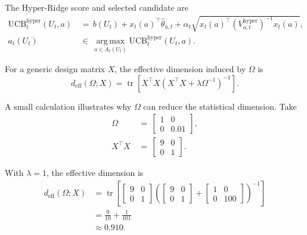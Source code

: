 \documentclass{article} %
\begin{document}
The Hyper-Ridge score and selected candidate are
\begin{align}
\mathrm{UCB}_{t}^{\mathrm{hyper}}(U_t,a)
&\,=\,
b(U_t)+x_t(a)^\top \widehat{\theta}_{a,t}
+
\alpha_t
\sqrt{
x_t(a)^\top
\left(V_{a,t}^{\mathrm{hyper}}\right)^{-1}
x_t(a)
},
\label{eq:hyper-ucb-app}
\\
a_t(U_t)
&\,\in\,
\operatorname*{arg\,max}_{a\in A_t(U_t)}
\mathrm{UCB}_{t}^{\mathrm{hyper}}(U_t,a).
\label{eq:hyper-action}
\end{align}

For a generic design matrix \(X\), the effective dimension induced by \(\Omega\) is
\begin{equation}
\label{eq:hyper-deff-app}
d_{\mathrm{eff}}(\Omega;X)
=
\operatorname{tr}
\!\left[
X^\top X
\left(
X^\top X+\lambda\Omega^{-1}
\right)^{-1}
\right].
\end{equation}

A small calculation illustrates why \(\Omega\) can reduce the statistical
dimension. Take
\begin{align}
\Omega
&\,=\,
\begin{bmatrix}
1&0\\
0&0.01
\end{bmatrix},
\label{eq:hyper-example-omega}
\\
X^\top X
&\,=\,
\begin{bmatrix}
9&0\\
0&1
\end{bmatrix}.
\label{eq:hyper-example-xtx}
\end{align}

With \(\lambda=1\), the effective dimension is
\begin{equation}
\label{eq:hyper-example-deff-app}
\begin{aligned}
d_{\mathrm{eff}}(\Omega;X)
&=
\operatorname{tr}
\left[
\begin{bmatrix}
9&0\\
0&1
\end{bmatrix}
\left(
\begin{bmatrix}
9&0\\
0&1
\end{bmatrix}
+
\begin{bmatrix}
1&0\\
0&100
\end{bmatrix}
\right)^{-1}
\right]
\\
&=
\frac{9}{10}+\frac{1}{101}
\\
&\approx
0.910 .
\end{aligned}
\end{equation}
\end{document}
